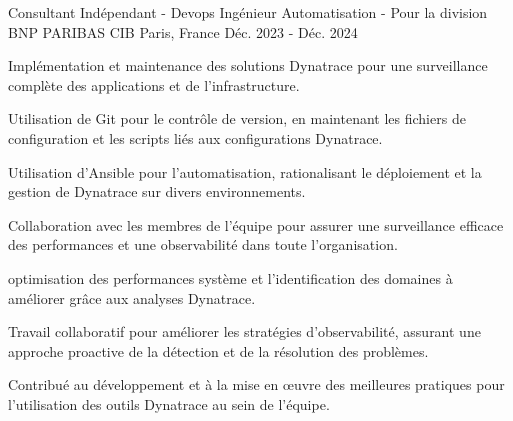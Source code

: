 

\begin{cventries}

  \cventry
    {Consultant Indépendant - Devops  Ingénieur Automatisation - }  %
    {Pour la division BNP PARIBAS CIB} %
    {Paris, France} %
    {Déc. 2023 - Déc. 2024} %
    {
      \begin{cvitems} %
        \item {Implémentation et maintenance des solutions Dynatrace pour une surveillance complète des applications et de l'infrastructure.}
        \item {Utilisation de Git pour le contrôle de version, en maintenant les fichiers de configuration et les scripts liés aux configurations Dynatrace.}
        \item {Utilisation d'Ansible pour l'automatisation, rationalisant le déploiement et la gestion de Dynatrace sur divers environnements.}
        \item {Collaboration avec les membres de l'équipe pour assurer une surveillance efficace des performances et une observabilité dans toute l'organisation.}
        \item {optimisation des performances système et l'identification des domaines à améliorer grâce aux analyses Dynatrace.}
        \item {Travail collaboratif pour améliorer les stratégies d'observabilité, assurant une approche proactive de la détection et de la résolution des problèmes.}
        \item {Contribué au développement et à la mise en œuvre des meilleures pratiques pour l'utilisation des outils Dynatrace au sein de l'équipe.}
      \end{cvitems}
    }


\end{cventries}
